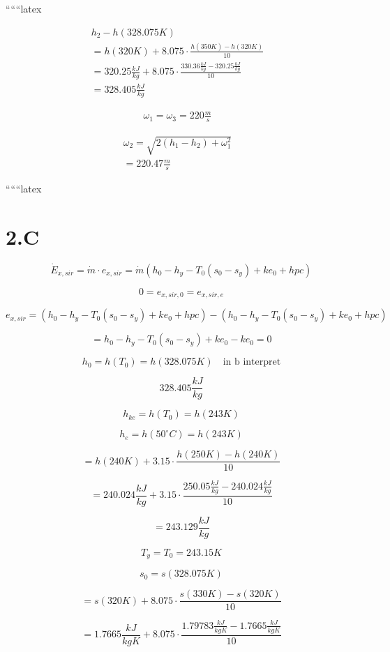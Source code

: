 ``````latex

\begin{align*}
h_2 - h(328.075K) & \\
= h(320K) + 8.075 \cdot \frac{h(350K) - h(320K)}{10} & \\
= 320.25 \frac{kJ}{kg} + 8.075 \cdot \frac{330.36 \frac{kJ}{kg} - 320.25 \frac{kJ}{kg}}{10} & \\
= 328.405 \frac{kJ}{kg} &
\end{align*}

\begin{align*}
\omega_1 = \omega_3 = 220 \frac{m}{s} &
\end{align*}

\begin{align*}
\omega_2 = \sqrt{2(h_1 - h_2) + \omega_1^2} & \\
= 220.47 \frac{m}{s} &
\end{align*}

``````latex


\section*{2.C}

\[
\dot{E}_{x,sir} = \dot{m} \cdot e_{x,sir} = \dot{m} (h_0 - h_y - T_0 (s_0 - s_y) + ke_0 + hpc)
\]

\[
0 = e_{x,sir,0} = e_{x,sir,e}
\]

\[
e_{x,sir} = (h_0 - h_y - T_0 (s_0 - s_y) + ke_0 + hpc) - (h_0 - h_y - T_0 (s_0 - s_y) + ke_0 + hpc)
\]

\[
= h_0 - h_y - T_0 (s_0 - s_y) + ke_0 - ke_0 = 0
\]

\[
h_0 = h(T_0) = h(328.075K) \quad \text{in b interpret}
\]

\[
328.405 \frac{kJ}{kg}
\]

\[
h_{ke} = h(T_0) = h(243K)
\]

\[
h_e = h(50^\circ C) = h(243K)
\]

\[
= h(240K) + 3.15 \cdot \frac{h(250K) - h(240K)}{10}
\]

\[
= 240.024 \frac{kJ}{kg} + 3.15 \cdot \frac{250.05 \frac{kJ}{kg} - 240.024 \frac{kJ}{kg}}{10}
\]

\[
= 243.129 \frac{kJ}{kg}
\]

\[
T_y = T_0 = 243.15K
\]

\[
s_0 = s(328.075K)
\]

\[
= s(320K) + 8.075 \cdot \frac{s(330K) - s(320K)}{10}
\]

\[
= 1.7665 \frac{kJ}{kgK} + 8.075 \cdot \frac{1.79783 \frac{kJ}{kgK} - 1.7665 \frac{kJ}{kgK}}{10}
\]


